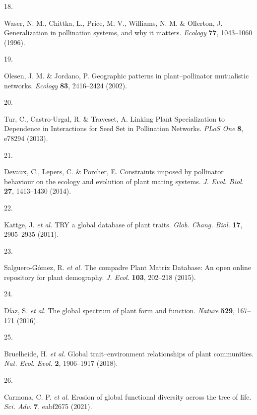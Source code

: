 \documentclass[
  12pt,
  a4paper,
]{article}
\newlength{\cslhangindent}
\newlength{\csllabelwidth}
\newlength{\cslentryspacingunit} %
\newenvironment{CSLReferences}[2] %
 {%
  \setlength{\parindent}{0pt}
  \ifodd #1
  \let\oldpar\par
  \def\par{\hangindent=\cslhangindent\oldpar}
  \fi
  \setlength{\parskip}{#2\cslentryspacingunit}
 }%
 {}
\newcommand{\CSLLeftMargin}[1]{\parbox[t]{\csllabelwidth}{#1}}
\newcommand{\CSLRightInline}[1]{\parbox[t]{\linewidth - \csllabelwidth}{#1}\break}
\begin{document}
\begin{CSLReferences}{0}{0}
\leavevmode{}%
\CSLLeftMargin{18. }
\CSLRightInline{Waser, N. M., Chittka, L., Price, M. V., Williams, N. M. \& Ollerton, J. Generalization in pollination systems, and why it matters. \emph{Ecology} \textbf{77}, 1043--1060 (1996).}

\leavevmode{}%
\CSLLeftMargin{19. }
\CSLRightInline{Olesen, J. M. \& Jordano, P. Geographic patterns in plant--pollinator mutualistic networks. \emph{Ecology} \textbf{83}, 2416--2424 (2002).}

\leavevmode{}%
\CSLLeftMargin{20. }
\CSLRightInline{Tur, C., Castro-Urgal, R. \& Traveset, A. Linking {Plant Specialization} to {Dependence} in {Interactions} for {Seed Set} in {Pollination Networks}. \emph{PLoS One} \textbf{8}, e78294 (2013).}

\leavevmode{}%
\CSLLeftMargin{21. }
\CSLRightInline{Devaux, C., Lepers, C. \& Porcher, E. Constraints imposed by pollinator behaviour on the ecology and evolution of plant mating systems. \emph{J. Evol. Biol.} \textbf{27}, 1413--1430 (2014).}

\leavevmode{}%
\CSLLeftMargin{22. }
\CSLRightInline{Kattge, J. \emph{et al.} {TRY} \textendash{} a global database of plant traits. \emph{Glob. Chang. Biol.} \textbf{17}, 2905--2935 (2011).}

\leavevmode{}%
\CSLLeftMargin{23. }
\CSLRightInline{Salguero-Gómez, R. \emph{et al.} The compadre {Plant Matrix Database}: An open online repository for plant demography. \emph{J. Ecol.} \textbf{103}, 202--218 (2015).}

\leavevmode{}%
\CSLLeftMargin{24. }
\CSLRightInline{Díaz, S. \emph{et al.} The global spectrum of plant form and function. \emph{Nature} \textbf{529}, 167--171 (2016).}

\leavevmode{}%
\CSLLeftMargin{25. }
\CSLRightInline{Bruelheide, H. \emph{et al.} Global trait--environment relationships of plant communities. \emph{Nat. Ecol. Evol.} \textbf{2}, 1906--1917 (2018).}

\leavevmode{}%
\CSLLeftMargin{26. }
\CSLRightInline{Carmona, C. P. \emph{et al.} Erosion of global functional diversity across the tree of life. \emph{Sci. Adv.} \textbf{7}, eabf2675 (2021).}


\end{CSLReferences}
\end{document}
